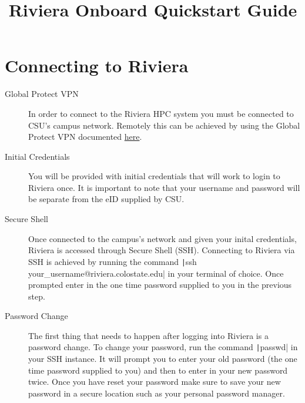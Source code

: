 \documentclass[11pt,letterpaper]{article}
\title{Riviera Onboard Quickstart Guide}
\begin{document}
\startdoc

\section{Connecting to Riviera}

\begin{description}
    \item[Global Protect VPN] In order to connect to the Riviera HPC system you must be connected to CSU's campus network. Remotely this can be achieved by using the Global Protect VPN documented \href{https://csusystem.freshservice.com/support/solutions/folders/23000047198}{here}.
    \item[Initial Credentials] You will be provided with initial credentials that will work to login to Riviera once. It is important to note that your username and password will be separate from the eID supplied by CSU.
    \item[Secure Shell] Once connected to the campus's network and given your inital credentials, Riviera is accessed through Secure Shell (SSH). Connecting to Riviera via SSH is achieved by running the command \texttt|ssh your_username@riviera.colostate.edu| in your terminal of choice. Once prompted enter in the one time password supplied to you in the previous step.
    \item[Password Change] The first thing that needs to happen after logging into Riviera is a password change. To change your password, run the command \texttt|passwd| in your SSH instance. It will prompt you to enter your old password (the one time password supplied to you) and then to enter in your new password twice. Once you have reset your password make sure to save your new password in a secure location such as your personal password manager.
\end{description}
\end{document}
